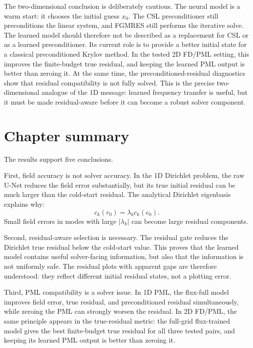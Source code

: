 The two-dimensional conclusion is deliberately cautious. The neural model is a
warm start: it chooses the initial guess $x_0$. The CSL preconditioner still
preconditions the linear system, and FGMRES still performs the iterative solve.
The learned model should therefore not be described as a replacement for CSL or
as a learned preconditioner. Its current role is to provide a better initial
state for a classical preconditioned Krylov method. In the tested 2D FD/PML
setting, this improves the finite-budget true residual, and keeping the
learned PML output is better than zeroing it. At the same time, the
preconditioned-residual diagnostics show that residual compatibility is not
fully solved. This is the precise two-dimensional analogue of the 1D message:
learned frequency transfer is useful, but it must be made residual-aware
before it can become a robust solver component.

\section{Chapter summary}
\label{sec:results-summary}

The results support five conclusions.

First, field accuracy is not solver accuracy. In the 1D Dirichlet problem, the
raw U-Net reduces the field error substantially, but its true initial residual
can be much larger than the cold-start residual. The analytical Dirichlet
eigenbasis explains why:
\[
    c_k(r_0)=\lambda_k c_k(e_0).
\]
Small field errors in modes with large $|\lambda_k|$ can become large
residual components.

Second, residual-aware selection is necessary. The residual gate reduces the
Dirichlet true residual below the cold-start value. This proves that the
learned model contains useful solver-facing information, but also that the
information is not uniformly safe. The residual plots with apparent gaps are
therefore understood: they reflect different initial residual states, not a
plotting error.

Third, PML compatibility is a solver issue. In 1D PML, the flux-full model
improves field error, true residual, and preconditioned residual
simultaneously, while zeroing the PML can strongly worsen the residual. In 2D
FD/PML, the same principle appears in the true-residual metric: the full-grid
flux-trained model gives the best finite-budget true residual for all three
tested pairs, and keeping its learned PML output is better than zeroing it.


